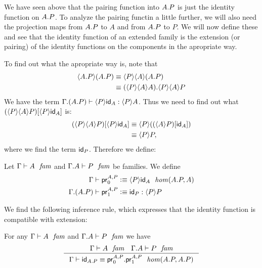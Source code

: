 We have seen above that the pairing function into $\ctxext{A}{P}$ is just the identity function on
$\ctxext{A}{P}$. To analyze the pairing functin a little further, we will also
need the projection maps from $\ctxext{A}{P}$ to $A$ and from $\ctxext{A}{P}$
to $P$. We will now define these and see that the identity function of an
extended family is the extension (or pairing) of the identity
functions on the components in the apropriate way.

To find out what the
apropriate way is, note that
\begin{align*}
\ctxwk{\ctxext{A}{P}}{\ctxext{A}{P}} & \jdeq \ctxwk{P}{{A}{\ctxext{A}{P}}}\\
& \jdeq \ctxext{\ctxwk{P}{{A}{A}}}{\ctxwk{P}{{A}{P}}}
\end{align*}
We have the term $\jterm{{\Gamma}{{A}{P}}}{\ctxwk{P}{A}}{\ctxwk{P}{\idfunc[A]}}$.
Thus we need to find out what $\subst{\ctxwk{P}{\idfunc[A]}}{\ctxwk{P}{{A}{P}}}$ is:
\begin{align*}
\subst{\ctxwk{P}{\idfunc[A]}}{\ctxwk{P}{{A}{P}}} & \jdeq \ctxwk{P}{\subst{\idfunc[A]}{\ctxwk{A}{P}}}\\
& \jdeq \ctxwk{P}{P},
\end{align*}
where we find the term $\idfunc[P]$. Therefore we define:

\begin{defn}
Let $\jfam{\Gamma}{A}$ and $\jfam{{\Gamma}{A}}{P}$ be families. We define
\begin{align*}
\jhomdefn*{\Gamma}{{A}{P}}{A}{\cprojfstf{A}{P}}{\unfold{\cprojfstf{A}{P}}}\\
\jtermdefn*{\ctxext{\Gamma}{{A}{P}}}{\ctxwk{P}{P}}{\cprojsndf{A}{P}}{\idfunc[P]}
\end{align*}
\end{defn}

We find the following inference rule, which expresses that the identity function
is compatible with extension:

\begin{lem}
For any $\jfam{\Gamma}{A}$ and $\jfam{{\Gamma}{A}}{P}$ we have
\begin{equation}\label{idfunc-ext-comp}
\inference
  {\jfam{\Gamma}{A}
   \jfam{{\Gamma}{A}}{P}}
  {\jhomeq{\Gamma}{{A}{P}}{{A}{P}}
    {\idfunc[\ctxext{A}{P}]}
    {\tmext{\ctxwk{\ctxext{A}{P}}{A}}{\ctxwk{\ctxext{A}{P}}{P}}{\cprojfstf{A}{P}}{\cprojsndf{A}{P}}}}
\end{equation}
\end{lem}

